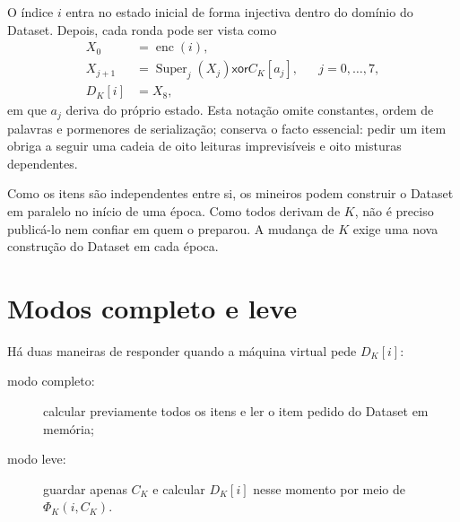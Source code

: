 O índice \(i\) entra no estado inicial de forma injectiva dentro do domínio do
Dataset. Depois, cada ronda pode ser vista como
\begin{align*}
 X_0&=\operatorname{enc}(i),\\
 X_{j+1}&=\operatorname{Super}_j(X_j)\mathbin{\mathsf{xor}}C_K[a_j],
       &&j=0,\ldots,7,\\
 D_K[i]&=X_8,
\end{align*}
em que \(a_j\) deriva do próprio estado. Esta notação omite constantes,
ordem de palavras e pormenores de serialização; conserva o facto essencial:
pedir um item obriga a seguir uma cadeia de oito leituras imprevisíveis e oito
misturas dependentes.

Como os itens são independentes entre si, os mineiros podem construir o
Dataset em paralelo no início de uma época. Como todos derivam de \(K\), não
é preciso publicá-lo nem confiar em quem o preparou. A mudança de \(K\) exige
uma nova construção do Dataset em cada época.


\section{Modos completo e leve}
\label{sec:randomx-fast-light}

Há duas maneiras de responder quando a máquina virtual pede \(D_K[i]\):
\begin{description}
 \item[modo completo:] calcular previamente todos os itens e ler o item pedido
 do Dataset em memória;
 \item[modo leve:] guardar apenas \(C_K\) e calcular \(D_K[i]\) nesse momento
 por meio de \(\Phi_K(i,C_K)\).
\end{description}

\begin{center}
\end{center}

